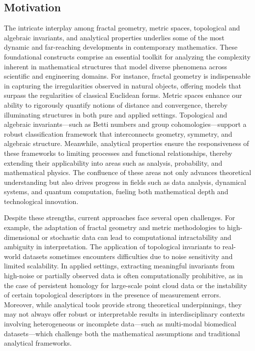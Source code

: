 \documentclass[sigconf]{acmart}
\begin{document}
\maketitle

\subsection{Motivation}

The intricate interplay among fractal geometry, metric spaces, topological and algebraic invariants, and analytical properties underlies some of the most dynamic and far-reaching developments in contemporary mathematics. These foundational constructs comprise an essential toolkit for analyzing the complexity inherent in mathematical structures that model diverse phenomena across scientific and engineering domains. For instance, fractal geometry is indispensable in capturing the irregularities observed in natural objects, offering models that surpass the regularities of classical Euclidean forms. Metric spaces enhance our ability to rigorously quantify notions of distance and convergence, thereby illuminating structures in both pure and applied settings. Topological and algebraic invariants—such as Betti numbers and group cohomologies—support a robust classification framework that interconnects geometry, symmetry, and algebraic structure. Meanwhile, analytical properties ensure the responsiveness of these frameworks to limiting processes and functional relationships, thereby extending their applicability into areas such as analysis, probability, and mathematical physics. The confluence of these areas not only advances theoretical understanding but also drives progress in fields such as data analysis, dynamical systems, and quantum computation, fueling both mathematical depth and technological innovation.

Despite these strengths, current approaches face several open challenges. For example, the adaptation of fractal geometry and metric methodologies to high-dimensional or stochastic data can lead to computational intractability and ambiguity in interpretation. The application of topological invariants to real-world datasets sometimes encounters difficulties due to noise sensitivity and limited scalability. In applied settings, extracting meaningful invariants from high-noise or partially observed data is often computationally prohibitive, as in the case of persistent homology for large-scale point cloud data or the instability of certain topological descriptors in the presence of measurement errors. Moreover, while analytical tools provide strong theoretical underpinnings, they may not always offer robust or interpretable results in interdisciplinary contexts involving heterogeneous or incomplete data—such as multi-modal biomedical datasets—which challenge both the mathematical assumptions and traditional analytical frameworks.
\end{document}
